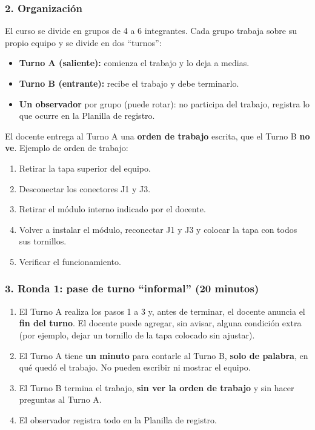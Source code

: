 \subsubsection*{2. Organización}
El curso se divide en grupos de 4 a 6 integrantes. Cada grupo trabaja sobre su propio
equipo y se divide en dos ``turnos'':
\begin{itemize}
  \item \textbf{Turno A (saliente):} comienza el trabajo y lo deja a medias.
  \item \textbf{Turno B (entrante):} recibe el trabajo y debe terminarlo.
  \item \textbf{Un observador} por grupo (puede rotar): no participa del trabajo, registra lo
        que ocurre en la Planilla de registro.
\end{itemize}
El docente entrega al Turno A una \textbf{orden de trabajo} escrita, que el Turno B
\textbf{no ve}. Ejemplo de orden de trabajo:
\begin{enumerate}
  \item Retirar la tapa superior del equipo.
  \item Desconectar los conectores J1 y J3.
  \item Retirar el módulo interno indicado por el docente.
  \item Volver a instalar el módulo, reconectar J1 y J3 y colocar la tapa con todos sus
        tornillos.
  \item Verificar el funcionamiento.
\end{enumerate}

\subsubsection*{3. Ronda 1: pase de turno ``informal'' (20 minutos)}
\begin{enumerate}
  \item El Turno A realiza los pasos 1 a 3 y, antes de terminar, el docente anuncia el
        \textbf{fin del turno}. El docente puede agregar, sin avisar, alguna condición extra
        (por ejemplo, dejar un tornillo de la tapa colocado sin ajustar).
  \item El Turno A tiene \textbf{un minuto} para contarle al Turno B, \textbf{solo de palabra},
        en qué quedó el trabajo. No pueden escribir ni mostrar el equipo.
  \item El Turno B termina el trabajo, \textbf{sin ver la orden de trabajo} y sin hacer
        preguntas al Turno A.
  \item El observador registra todo en la Planilla de registro.
\end{enumerate}

